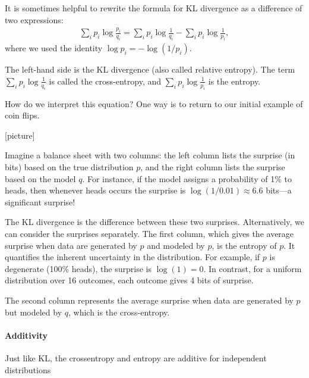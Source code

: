 \documentclass{article}
\begin{document}

It is sometimes helpful to rewrite the formula for KL divergence as a difference of two expressions:
\begin{align}
\label{eq:split_KL}
\sum_i p_i \log \frac{p_i}{q_i} 
= \sum_i p_i \log \frac{1}{q_i} 
- \sum_i p_i \log \frac{1}{p_i},
\end{align}
where we used the identity \(\log p_i = -\log(1/p_i)\).

The left-hand side is the KL divergence (also called relative entropy). The term \(\sum_i p_i \log \frac{1}{q_i}\) is called the cross-entropy, and \(\sum_i p_i \log \frac{1}{p_i}\) is the entropy.

How do we interpret this equation? One way is to return to our initial example of coin flips.

\begin{center}
[picture]
\end{center}

Imagine a balance sheet with two columns: the left column lists the surprise (in bits) based on the true distribution \(p\), and the right column lists the surprise based on the model \(q\). For instance, if the model assigns a probability of 1\% to heads, then whenever heads occurs the surprise is \(\log(1/0.01) \approx 6.6\) bits—a significant surprise!

The KL divergence is the difference between these two surprises. Alternatively, we can consider the surprises separately. The first column, which gives the average surprise when data are generated by \(p\) and modeled by \(p\), is the entropy of \(p\). It quantifies the inherent uncertainty in the distribution. For example, if \(p\) is degenerate (100\% heads), the surprise is \(\log(1)=0\). In contrast, for a uniform distribution over 16 outcomes, each outcome gives 4 bits of surprise.

The second column represents the average surprise when data are generated by \(p\) but modeled by \(q\), which is the cross-entropy.

\paragraph{Additivity}
Just like KL, the crossentropy and entropy are additive for independent distributions
\end{document}
